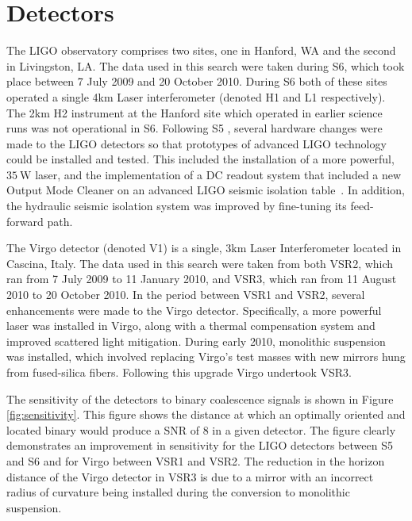 \documentclass[prd,superscriptaddress,showpacs,amssymb,amsmath,amsfonts,aps,altaffilletter,nofootinbib,letterpaper,twocolumn]{revtex4}
\begin{document}
\section{Detectors}
\label{sec:dets}

The \ac{LIGO} observatory comprises two sites, one in Hanford, WA and the
second in Livingston, LA.  The data used in this search were taken during
\ac{S6}, which took place between 7 July 2009 and 20 October 2010.  During
\ac{S6} both of these sites operated a single 4km Laser interferometer (denoted
H1 and L1 respectively).  The 2km H2 instrument at the Hanford site which
operated in earlier science runs was not operational in \ac{S6}.  Following
\ac{S5} \cite{Abbott:2007kv}, several hardware changes were made to the
\ac{LIGO} detectors so that prototypes of advanced LIGO technology could be
installed and tested. This included the installation of a more powerful,
$35~\mathrm{W}$ laser, and the implementation of a DC readout system that
included a new Output Mode Cleaner on an advanced LIGO seismic isolation
table~\cite{Adhikari:2006}. In addition, the hydraulic seismic isolation system
was improved by fine-tuning its feed-forward path.  

The Virgo detector (denoted V1) is a single, 3km Laser Interferometer
located in Cascina, Italy.  The data used in this search were taken from
both \ac{VSR2},  which ran from 7 July 2009 to 11 January 2010, and
\ac{VSR3},  which ran from 11 August 2010 to 20 October 2010.  In the
period between \ac{VSR1} and \ac{VSR2}, several enhancements were made
to the Virgo detector.  Specifically, a more powerful laser was
installed in Virgo, along with a thermal compensation system and
improved scattered light mitigation.  During early 2010, monolithic
suspension was installed, which involved replacing Virgo's test masses
with new mirrors hung from fused-silica fibers.  Following this upgrade
Virgo undertook \ac{VSR3}. 

The sensitivity of the detectors to binary coalescence signals is shown
in Figure \ref{fig:sensitivity}.   This figure shows the distance at
which an optimally oriented and located binary would produce a \ac{SNR}
of 8 in a given detector.  The figure clearly demonstrates an
improvement in sensitivity for the \ac{LIGO} detectors between \ac{S5}
and \ac{S6} and for Virgo between \ac{VSR1} and \ac{VSR2}.  The
reduction in the horizon distance of the Virgo detector in \ac{VSR3} is
due to a mirror with an incorrect radius of curvature being installed
during the conversion to monolithic suspension.
\end{document}
